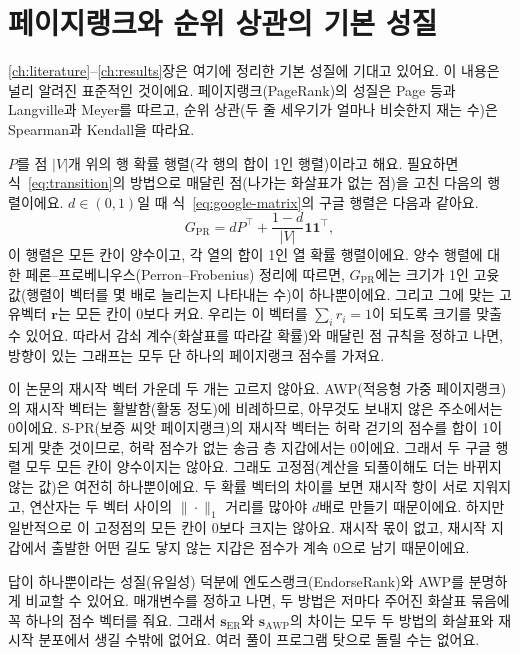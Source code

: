 \section{페이지랭크와 순위 상관의 기본 성질}
\label{ch:appendix-theory}

\ref{ch:literature}--\ref{ch:results}장은 여기에 정리한 기본 성질에 기대고 있어요. 이 내용은 널리 알려진 표준적인 것이에요. 페이지랭크(PageRank)의 성질은 Page 등과 Langville과 Meyer를 따르고, 순위 상관(두 줄 세우기가 얼마나 비슷한지 재는 수)은 Spearman과 Kendall을 따라요.


$P$를 점 $|V|$개 위의 행 확률 행렬(각 행의 합이 1인 행렬)이라고 해요. 필요하면 식~\eqref{eq:transition}의 방법으로 매달린 점(나가는 화살표가 없는 점)을 고친 다음의 행렬이에요. $d\in(0,1)$일 때 식~\eqref{eq:google-matrix}의 구글 행렬은 다음과 같아요.
\[
G_{\mathrm{PR}}=d P^{\top}+\frac{1-d}{|V|}\mathbf{1}\mathbf{1}^{\top},
\]
이 행렬은 모든 칸이 양수이고, 각 열의 합이 1인 열 확률 행렬이에요. 양수 행렬에 대한 페론--프로베니우스(Perron--Frobenius) 정리에 따르면, $G_{\mathrm{PR}}$에는 크기가 1인 고윳값(행렬이 벡터를 몇 배로 늘리는지 나타내는 수)이 하나뿐이에요. 그리고 그에 맞는 고유벡터 $\mathbf{r}$는 모든 칸이 0보다 커요. 우리는 이 벡터를 $\sum_i r_i=1$이 되도록 크기를 맞출 수 있어요. 따라서 감쇠 계수(화살표를 따라갈 확률)와 매달린 점 규칙을 정하고 나면, 방향이 있는 그래프는 모두 단 하나의 페이지랭크 점수를 가져요.

이 논문의 재시작 벡터 가운데 두 개는 고르지 않아요. AWP(적응형 가중 페이지랭크)의 재시작 벡터는 활발함(활동 정도)에 비례하므로, 아무것도 보내지 않은 주소에서는 0이에요. S-PR(보증 씨앗 페이지랭크)의 재시작 벡터는 허락 걷기의 점수를 합이 1이 되게 맞춘 것이므로, 허락 점수가 없는 송금 층 지갑에서는 0이에요. 그래서 두 구글 행렬 모두 모든 칸이 양수이지는 않아요. 그래도 고정점(계산을 되풀이해도 더는 바뀌지 않는 값)은 여전히 하나뿐이에요. 두 확률 벡터의 차이를 보면 재시작 항이 서로 지워지고, 연산자는 두 벡터 사이의 $\|\cdot\|_1$ 거리를 많아야 $d$배로 만들기 때문이에요. 하지만 일반적으로 이 고정점의 모든 칸이 0보다 크지는 않아요. 재시작 몫이 없고, 재시작 지갑에서 출발한 어떤 길도 닿지 않는 지갑은 점수가 계속 0으로 남기 때문이에요.

답이 하나뿐이라는 성질(유일성) 덕분에 엔도스랭크(EndorseRank)와 AWP를 분명하게 비교할 수 있어요. 매개변수를 정하고 나면, 두 방법은 저마다 주어진 화살표 묶음에 꼭 하나의 점수 벡터를 줘요. 그래서 $\mathbf{s}_{\mathrm{ER}}$와 $\mathbf{s}_{\mathrm{AWP}}$의 차이는 모두 두 방법의 화살표와 재시작 분포에서 생길 수밖에 없어요. 여러 풀이 프로그램 탓으로 돌릴 수는 없어요.


